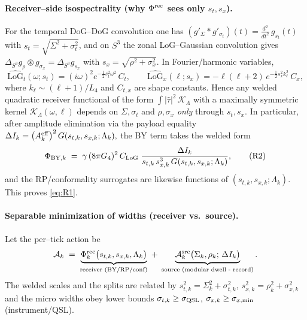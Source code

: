 \documentclass[10pt]{article}
\theoremstyle{definition}
\theoremstyle{plain}
\begin{document}
\paragraph{Receiver–side isospectrality (why \(\Phi^{\rm rec}\) sees only \(s_t,s_x\)).}\label{par:uom-main-056}
For the temporal DoG–DoG convolution one has
\(
(g'_{\Sigma}*g'_{\sigma_t})(t)
= \frac{d^2}{dt^2}\,g_{s_t}(t)
\) 
with \(s_t=\sqrt{\Sigma^2+\sigma_t^2}\), and on \(S^3\) the zonal LoG–Gaussian convolution gives
\(
\Delta_{S^3}g_{\rho}\circledast g_{\sigma_x}=\Delta_{S^3}g_{s_x}
\)
with \(s_x=\sqrt{\rho^2+\sigma_x^2}\).
In Fourier/harmonic variables,
\[
\widehat{\mathrm{LoG}}_t(\omega;s_t)=(i\omega)^2 e^{-\tfrac12 s_t^2\omega^2}\,C_t,\qquad
\widehat{\mathrm{LoG}}_x(\ell;s_x)= -\ell(\ell+2)\,e^{-\tfrac12 s_x^2 k_\ell^2}\,C_x,
\]
where \(k_\ell\!\sim\!(\ell{+}1)/L_4\) and \(C_{t,x}\) are shape constants.
Hence any welded quadratic receiver functional of the form
\(
\int |\widehat{\tau}|^2\,\mathcal K_\Lambda
\)
with a maximally symmetric kernel \(\mathcal K_\Lambda(\omega,\ell)\) depends on \(\Sigma,\sigma_t\) and \(\rho,\sigma_x\) \emph{only} through \(s_t,s_x\).
In particular, after amplitude elimination via the payload equality
\(
\Delta I_k=\big(A^{\rm eff}_k\big)^2\,G(s_{t,k},s_{x,k};\Lambda_k),
\)
the BY term takes the welded form
\begin{equation}
\Phi_{{\rm BY},k} \;=\; 
\gamma\,(8\pi G_4)^2\,C_{\rm LoG}\;
\frac{\Delta I_k}{s_{t,k}\,s_{x,k}^{3}\,G(s_{t,k},s_{x,k};\Lambda_k)},
\tag{R2}\label{eq:R2}
\end{equation}
and the RP/conformality surrogates are likewise functions of \((s_{t,k},s_{x,k};\Lambda_k)\).
This proves \eqref{eq:R1}.

\paragraph{Separable minimization of widths (receiver vs.\ source).}\label{par:uom-main-057}
Let the per–tick action be
\[
\mathcal A_k\;=\;
\underbrace{\Phi^{\rm rec}_k\big(s_{t,k},s_{x,k},\Lambda_k\big)}_{\text{receiver (BY/RP/conf)}}
\;+\;
\underbrace{\mathcal A^{\rm src}_k\big(\Sigma_k,\rho_k;\,\Delta I_k\big)}_\text{source (modular dwell - record)}.
\]
The welded scales and the splits are related by
\(
s_{t,k}^2=\Sigma_k^2+\sigma_{t,k}^2,\ 
s_{x,k}^2=\rho_k^2+\sigma_{x,k}^2
\)
and the micro widths obey lower bounds
\(\sigma_{t,k}\ge\sigma_{\rm QSL}\), \(\sigma_{x,k}\ge\sigma_{x,{\rm min}}\) (instrument/QSL).
\end{document}
